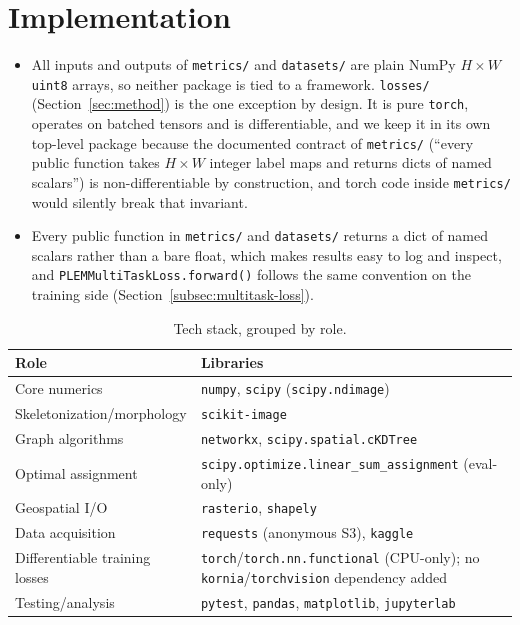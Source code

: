 \section{Implementation}
\label{sec:implementation}

\begin{itemize}
  \item All inputs and outputs of \texttt{metrics/} and \texttt{datasets/} are plain NumPy
    $H\times W$ \texttt{uint8} arrays, so neither package is tied to a framework.
    \texttt{losses/} (Section~\ref{sec:method}) is the one exception by design. It is pure
    \texttt{torch}, operates on batched tensors and is differentiable, and we keep it in its own
    top-level package because the documented contract of \texttt{metrics/} (``every public
    function takes $H\times W$ integer label maps and returns dicts of named scalars'') is
    non-differentiable by construction, and torch code inside \texttt{metrics/} would silently
    break that invariant.
  \item Every public function in \texttt{metrics/} and \texttt{datasets/} returns a dict of named
    scalars rather than a bare float, which makes results easy to log and inspect, and
    \texttt{PLEMMultiTaskLoss.forward()} follows the same convention on the training side
    (Section~\ref{subsec:multitask-loss}).
\end{itemize}

\begin{table}
  \caption{Tech stack, grouped by role.}
  \label{tab:techstack}
  \begin{tabular}{@{}>{\raggedright\arraybackslash}p{2.6cm}>{\raggedright\arraybackslash}p{5.3cm}@{}}
    \toprule
    Role & Libraries \\
    \midrule
    Core numerics & \texttt{numpy}, \texttt{scipy} (\texttt{scipy.ndimage}) \\
    Skeletonization/\allowbreak morphology & \texttt{scikit-image} \\
    Graph algorithms & \texttt{networkx}, \texttt{scipy.spatial.cKDTree} \\
    Optimal assignment & \texttt{scipy.optimize.linear\_sum\_assignment} (eval-only) \\
    Geospatial I/O & \texttt{rasterio}, \texttt{shapely} \\
    Data acquisition & \texttt{requests} (anonymous S3), \texttt{kaggle} \\
    Differentiable training losses & \texttt{torch}/\texttt{torch.nn.functional} (CPU-only); no
      \texttt{kornia}/\texttt{torchvision} dependency added \\
    Testing/analysis & \texttt{pytest}, \texttt{pandas}, \texttt{matplotlib}, \texttt{jupyterlab} \\
    \bottomrule
  \end{tabular}
\end{table}

